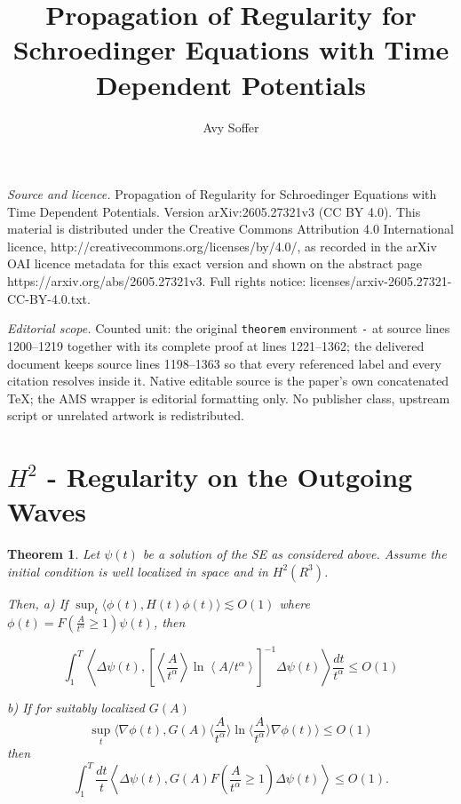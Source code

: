 \documentclass[10pt,a4paper]{amsart}
\newtheorem{theorem}{Theorem}[section]
\begin{document}
\title[Propagation of Regularity for Schroedinger Equations with Ti]{Propagation of Regularity for Schroedinger Equations with Time Dependent Potentials}
\author{Avy Soffer}
\date{}
\maketitle
\noindent\emph{Source and licence.} Propagation of Regularity for Schroedinger Equations with Time Dependent Potentials. Version arXiv:2605.27321v3 (CC BY 4.0). This material is distributed under the Creative Commons Attribution 4.0 International licence, http://creativecommons.org/licenses/by/4.0/, as recorded in the arXiv OAI licence metadata for this exact version and shown on the abstract page https://arxiv.org/abs/2605.27321v3. Full rights notice: licenses/arxiv-2605.27321-CC-BY-4.0.txt.\par\smallskip
\noindent\textit{Editorial scope.} Counted unit: the original \texttt{theorem} environment \texttt{-} at source lines 1200--1219 together with its complete proof at lines 1221--1362; the delivered document keeps source lines 1198--1363 so that every referenced label and every citation resolves inside it. Native editable source is the paper's own concatenated TeX; the AMS wrapper is editorial formatting only. No publisher class, upstream script or unrelated artwork is redistributed.
\section{$H^{2}$ - Regularity on the Outgoing Waves}


\begin{theorem}

Let $\psi(t)$ be a solution of the SE as considered above.
Assume the initial condition is well localized in space and in $H^{2}\left(R^{3}\right)$.


Then,\newline
a) If $\sup _{t}\langle\phi(t), H(t) \phi(t)\rangle \lesssim O(1)$
where $\phi(t)=F\left(\frac{A}{t^{\alpha}} \geqslant 1\right) \psi(t)$,
then

\begin{equation}
\int_{1}^{T}\left\langle\Delta \psi(t),\left[\left\langle\frac{A}{t^{\alpha}}\right\rangle \ln \left\langle A / t^{\alpha}\right\rangle\right]^{-1} \Delta \psi(t)\right\rangle \frac{d t}{t^{\alpha}} \leq O(1) \tag{C.2}
\end{equation}

b) If for suitably localized $G(A)$ \begin{equation}
\sup_t \langle \nabla\phi(t),G(A)\langle\frac{A}{t^{\alpha}}\rangle\ln{\langle\frac{A}{t^{\alpha}}\rangle}  \nabla \phi(t)\rangle\leq O(1) \tag{C.3a}\end{equation}
then \begin{equation}
\int_{1}^{T} \frac{d t}{t}\left\langle\Delta \psi(t), G(A) F\left(\frac{A}{t^{\alpha}} \geqslant 1\right) \Delta \psi(t)\right\rangle \leq O(1). \tag{C.3b}\end{equation}  
\end{theorem}
\end{document}
